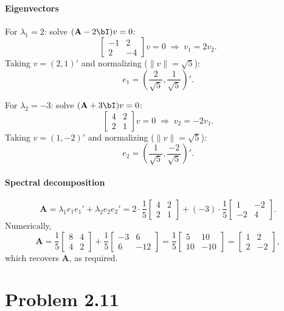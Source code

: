 \documentclass[11pt]{article}
\newcommand{\bA}{\mathbf{A}}
\begin{document}
\paragraph{Eigenvectors}
For $\lambda_1 = 2$: solve $(\bA - 2\bI)v = 0$:
\[
\begin{bmatrix} -1 & 2 \\ 2 & -4 \end{bmatrix} v = 0 \;\Longrightarrow\; v_1 = 2v_2.
\]
Taking $v = (2,1)'$ and normalizing ($\|v\| = \sqrt{5}$):
\[
e_1 = \left(\frac{2}{\sqrt5}, \frac{1}{\sqrt5}\right)'.
\]

For $\lambda_2 = -3$: solve $(\bA + 3\bI)v = 0$:
\[
\begin{bmatrix} 4 & 2 \\ 2 & 1 \end{bmatrix} v = 0 \;\Longrightarrow\; v_2 = -2v_1.
\]
Taking $v = (1,-2)'$ and normalizing ($\|v\| = \sqrt5$):
\[
e_2 = \left(\frac{1}{\sqrt5}, \frac{-2}{\sqrt5}\right)'.
\]

\paragraph{Spectral decomposition}
\[
\bA = \lambda_1 e_1 e_1' + \lambda_2 e_2 e_2'
= 2\cdot\frac{1}{5}\begin{bmatrix} 4 & 2 \\ 2 & 1 \end{bmatrix}
+ (-3)\cdot\frac{1}{5}\begin{bmatrix} 1 & -2 \\ -2 & 4 \end{bmatrix}.
\]
Numerically,
\[
\bA = \frac{1}{5}\begin{bmatrix} 8 & 4 \\ 4 & 2 \end{bmatrix} + \frac{1}{5}\begin{bmatrix} -3 & 6 \\ 6 & -12 \end{bmatrix}
= \frac{1}{5}\begin{bmatrix} 5 & 10 \\ 10 & -10 \end{bmatrix} = \begin{bmatrix} 1 & 2 \\ 2 & -2 \end{bmatrix},
\]
which recovers $\bA$, as required.

\section*{Problem 2.11}
\end{document}
